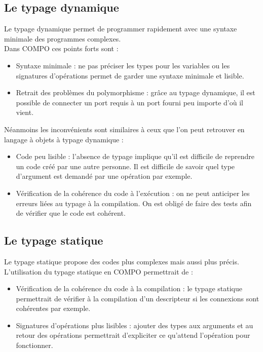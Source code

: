 \documentclass[11pt,a4paper,openany,oneside]{book}
\begin{document}
\subsection{Le typage dynamique}
Le typage dynamique permet de programmer rapidement avec une syntaxe minimale des programmes complexes.\\
Dans COMPO ces points forts sont : 
\begin{itemize}
\item Syntaxe minimale : ne pas préciser les types pour les variables ou les signatures d'opérations permet de garder une syntaxe minimale et lisible.
\item Retrait des problèmes du polymorphisme : grâce au typage dynamique, il est possible de connecter un port requis à un port fourni peu importe d'où il vient.
\end{itemize}

Néanmoins les inconvénients sont similaires à ceux que l'on peut retrouver en langage à objets à typage dynamique : 
\begin{itemize}
\item Code peu lisible : l'absence de typage implique qu'il est difficile de reprendre un code créé par une autre personne. Il est difficile de savoir quel type d'argument est demandé par une opération par exemple.
\item Vérification de la cohérence du code à l'exécution : on ne peut anticiper les erreurs liées au typage à la compilation. On est obligé de faire des tests afin de vérifier que le code est cohérent.
\end{itemize}

\subsection{Le typage statique}
Le typage statique propose des codes plus complexes mais aussi plus précis.\\
L'utilisation du typage statique en COMPO permettrait de : 
\begin{itemize}
\item Vérification de la cohérence du code à la compilation : le typage statique permettrait de vérifier à la compilation d'un descripteur si les connexions sont cohérentes par exemple.
\item Signatures d'opérations plus lisibles : ajouter des types aux arguments et au retour des opérations permettrait d'expliciter ce qu'attend l'opération pour fonctionner.
\end{itemize}
\end{document}
